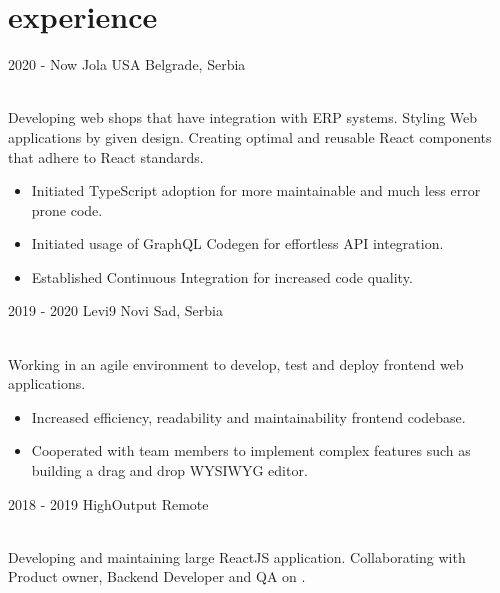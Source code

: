 \documentclass[]{cv-style}          %
\begin{document}

\section{experience}

\begin{entrylist}
  \entry
  {2020 - Now}
  {Jola USA}
  {Belgrade, Serbia}
  {\\
    Developing web shops that have integration with ERP systems. Styling Web applications by given design. Creating optimal and reusable React components that adhere to React standards.\\
    \subtitle{Detailed achievements:}
    \begin{itemize}
      \item Initiated TypeScript adoption for more maintainable and much less error prone code.
      \item Initiated usage of GraphQL Codegen for effortless API integration.
      \item Established Continuous Integration for increased code quality.
    \end{itemize}}
  \entry
  {2019 - 2020}
  {Levi9}
  {Novi Sad, Serbia}
  {\\
    Working in an agile environment to develop, test and deploy frontend web applications.\\
    \subtitle{Detailed achievements:}
    \begin{itemize}
      \item Increased efficiency, readability and maintainability frontend codebase.
      \item Cooperated with team members to implement complex features such as building a drag and drop WYSIWYG editor.
    \end{itemize}}
  \entry
  {2018 - 2019}
  {HighOutput}
  {Remote}
  {\\
    Developing and maintaining large ReactJS application. Collaborating with Product owner, Backend Developer and QA on .\\
    \subtitle{Detailed achievements:}
}
\end{entrylist}
\end{document}
